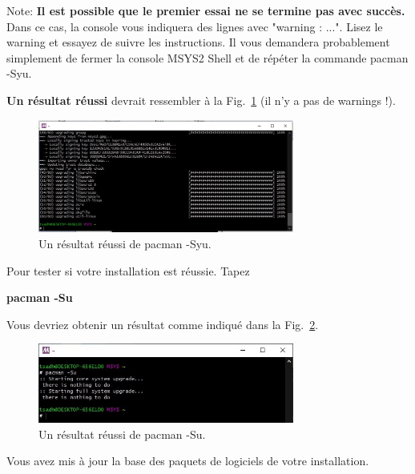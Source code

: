 \documentclass{article}
\newcommand\fig[1]{{Fig.~\ref{#1}}}
\begin{document}
Note: \textbf{Il est possible que le premier essai ne se termine pas avec succès.} Dans ce cas, la console vous indiquera des lignes avec "warning : ...". Lisez le warning et essayez de suivre les instructions. Il vous demandera probablement simplement de fermer la console MSYS2 Shell et de répéter la commande pacman -Syu.

\textbf{Un résultat réussi} devrait ressembler à la \fig{F:Syu} (il n'y a pas de warnings !).
\begin{figure}[H]
\center
\includegraphics[width=0.75\textwidth]{Plots/Msys2_9Terminal.jpeg}
\caption{Un résultat réussi de pacman -Syu.\label{F:Syu}}
\end{figure}
Pour tester si votre installation est réussie. Tapez
\begin{tcolorbox}[width=\textwidth,colframe=Purple,colback={black},title={Ceci est la console MSYS2 Shell},outer arc=0mm,colupper=white]    
      \large\textbf{pacman -Su}
\end{tcolorbox}
Vous devriez obtenir un résultat comme indiqué dans la \fig{F:Su}.
\begin{figure}[H]
\center
\includegraphics[width=0.75\textwidth]{Plots/Msys2_9b.jpeg}
\caption{Un résultat réussi de pacman -Su.\label{F:Su}}
\end{figure}
Vous avez mis à jour la base des paquets de logiciels de votre installation.
\end{document}
